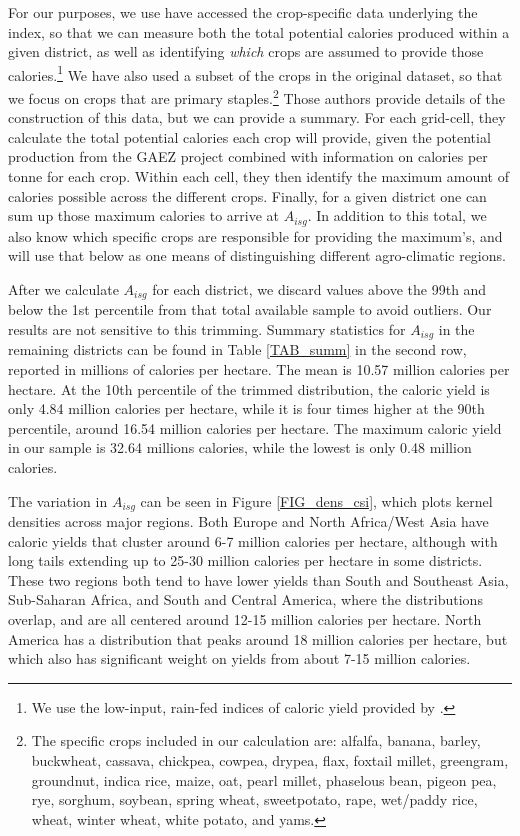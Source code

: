 \documentclass[11pt]{article}
\begin{document}
For our purposes, we use have accessed the crop-specific data underlying the \citet{galorozak2016} index, so that we can measure both the total potential calories produced within a given district, as well as identifying \textit{which} crops are assumed to provide those calories.\footnote{We use the low-input, rain-fed indices of caloric yield provided by \citet{galorozak2016}.} We have also used a subset of the crops in the original \citet{galorozak2016} dataset, so that we focus on crops that are primary staples.\footnote{The specific crops included in our calculation are: alfalfa, banana, barley, buckwheat, cassava, chickpea, cowpea, drypea, flax, foxtail millet, greengram, groundnut, indica rice, maize, oat, pearl millet, phaselous bean, pigeon pea, rye, sorghum, soybean, spring wheat, sweetpotato, rape, wet/paddy rice, wheat, winter wheat, white potato, and yams.} Those authors provide details of the construction of this data, but we can provide a summary. For each grid-cell, they calculate the total potential calories each crop will provide, given the potential production from the GAEZ project \citep{gaez} combined with information on calories per tonne for each crop. Within each cell, they then identify the maximum amount of calories possible across the different crops. Finally, for a given district one can sum up those maximum calories to arrive at $A_{isg}$. In addition to this total, we also know which specific crops are responsible for providing the maximum's, and will use that below as one means of distinguishing different agro-climatic regions.

After we calculate $A_{isg}$ for each district, we discard values above the 99th and below the 1st percentile from that total available sample to avoid outliers. Our results are not sensitive to this trimming. Summary statistics for $A_{isg}$ in the remaining districts can be found in Table \ref{TAB_summ} in the second row, reported in millions of calories per hectare. The mean is 10.57 million calories per hectare. At the 10th percentile of the trimmed distribution, the caloric yield is only 4.84 million calories per hectare, while it is four times higher at the 90th percentile, around 16.54 million calories per hectare. The maximum caloric yield in our sample is 32.64 millions calories, while the lowest is only 0.48 million calories. 

The variation in $A_{isg}$ can be seen in Figure \ref{FIG_dens_csi}, which plots kernel densities across major regions. Both Europe and North Africa/West Asia have caloric yields that cluster around 6-7 million calories per hectare, although with long tails extending up to 25-30 million calories per hectare in some districts. These two regions both tend to have lower yields than South and Southeast Asia, Sub-Saharan Africa, and South and Central America, where the distributions overlap, and are all centered around 12-15 million calories per hectare. North America has a distribution that peaks around 18 million calories per hectare, but which also has significant weight on yields from about 7-15 million calories. 
\end{document}
